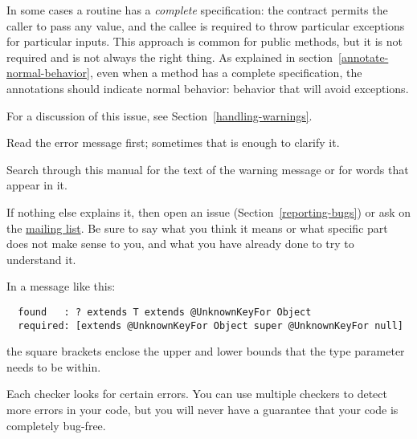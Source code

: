 In some cases a routine has a \emph{complete} specification:  the contract
permits the caller to pass any value, and the callee is required to throw
particular exceptions for particular inputs.  This approach is common for
public methods, but it is not required and is not always the right thing.
As explained in section~\ref{annotate-normal-behavior}, even when a method
has a complete specification, the annotations should indicate normal
behavior:  behavior that will avoid exceptions.





For a discussion of this issue, see Section~\ref{handling-warnings}.



Read the error message first; sometimes that is enough to clarify it.

Search through this manual for the text of the warning message or for words
that appear in it.

If nothing else explains it, then
open an issue (Section~\ref{reporting-bugs}) or ask on the
\href{https://groups.google.com/forum/#!forum/checker-framework-discuss}{mailing
  list}.  Be sure to say what you think it means or what specific part does
not make sense to you, and what you have already done to try to understand it.



In a message like this:

\begin{Verbatim}
  found   : ? extends T extends @UnknownKeyFor Object
  required: [extends @UnknownKeyFor Object super @UnknownKeyFor null]
\end{Verbatim}

\noindent
the square brackets enclose the upper and lower bounds that the type parameter needs to be within.



Each checker looks for certain errors.  You can use multiple checkers to
detect more errors in your code, but you will never have a guarantee that
your code is completely bug-free.

